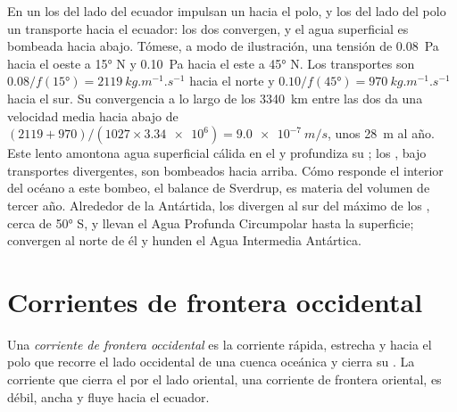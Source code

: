 En un  los  del lado del ecuador impulsan un  hacia el polo, y los  del lado del polo un transporte hacia el ecuador: los dos convergen, y el agua superficial es bombeada hacia abajo. Tómese, a modo de ilustración, una tensión de \qty{0.08}{Pa} hacia el oeste a \ang{15} N y
\qty{0.10}{Pa} hacia el este a \ang{45} N. Los transportes son
$0.08/f(\ang{15}) = \qty{2119}{kg.m^{-1}.s^{-1}}$ hacia el norte y $0.10/f(\ang{45}) =
\qty{970}{kg.m^{-1}.s^{-1}}$ hacia el sur. Su convergencia a lo largo de los \qty{3340}{km} entre las dos  da una velocidad media hacia abajo de
$(2119 + 970)/(1027 \times \num{3.34e6}) = \qty{9.0e-7}{m/s}$, unos \qty{28}{m} al año. Este  lento amontona agua superficial cálida en el  y profundiza su ; los , bajo transportes divergentes, son bombeados hacia arriba. Cómo responde el interior del océano a este bombeo, el balance de Sverdrup, es materia del volumen de tercer año. Alrededor de la Antártida, los  divergen al sur del máximo de los , cerca de \ang{50} S, y llevan el Agua Profunda Circumpolar hasta la superficie; convergen al norte de él y hunden el Agua Intermedia Antártica.

\section{Corrientes de frontera occidental}\label{sec:b1:ocean-circulation:wbc}

\begin{definition}\label{def:b1:ocean-circulation:wbc}
Una \emph{corriente de frontera occidental} es la corriente rápida, estrecha y hacia el polo que recorre el lado occidental de una cuenca oceánica y cierra su . La corriente que cierra el  por el lado oriental, una corriente de frontera oriental, es débil, ancha y fluye hacia el ecuador.
\end{definition}

